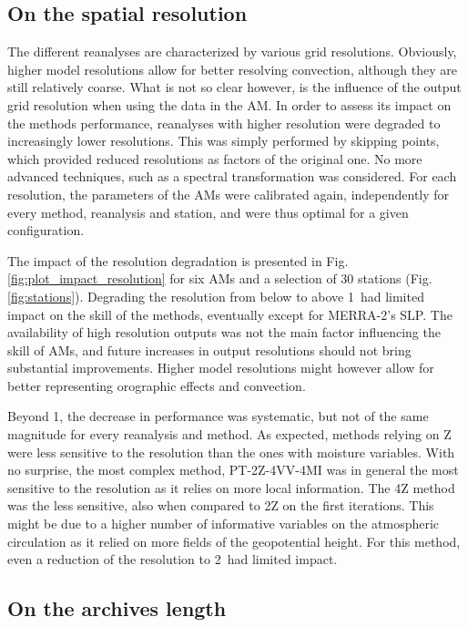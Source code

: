 \documentclass{ametsoc}
\begin{document}
\subsection{On the spatial resolution}
\label{sec:resolution}

The different reanalyses are characterized by various grid resolutions. Obviously, higher model resolutions allow for better resolving convection, although they are still relatively coarse. What is not so clear however, is the influence of the output grid resolution when using the data in the AM. In order to assess its impact on the methods performance, reanalyses with higher resolution were degraded to increasingly lower resolutions. This was simply performed by skipping points, which provided reduced resolutions as factors of the original one. No more advanced techniques, such as a spectral transformation was considered. For each resolution, the parameters of the AMs were calibrated again, independently for every method, reanalysis and station, and were thus optimal for a given configuration. 

The impact of the resolution degradation is presented in Fig. \ref{fig:plot_impact_resolution} for six AMs and a selection of 30 stations (Fig. \ref{fig:stations}). Degrading the resolution from below to above 1\degree\ had limited impact on the skill of the methods, eventually except for MERRA-2's SLP. The availability of high resolution outputs was not the main factor influencing the skill of AMs, and future increases in output resolutions should not bring substantial improvements. Higher model resolutions might however allow for better representing orographic effects and convection. 

Beyond 1\degree, the decrease in performance was systematic, but not of the same magnitude for every reanalysis and method. As expected, methods relying on Z were less sensitive to the resolution than the ones with moisture variables. With no surprise, the most complex method, PT-2Z-4VV-4MI was in general the most sensitive to the resolution as it relies on more local information. The 4Z method was the less sensitive, also when compared to 2Z on the first iterations. This might be due to a higher number of informative variables on the atmospheric circulation as it relied on more fields of the geopotential height. For this method, even a reduction of the resolution to 2\degree\ had limited impact.


\subsection{On the archives length}
\label{sec:length}
\end{document}
